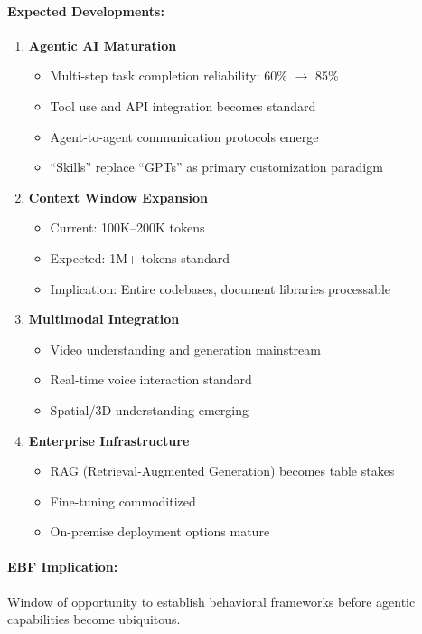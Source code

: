 \paragraph{Expected Developments:}
\begin{enumerate}
    \item \textbf{Agentic AI Maturation}
    \begin{itemize}
        \item Multi-step task completion reliability: 60\% $\rightarrow$ 85\%
        \item Tool use and API integration becomes standard
        \item Agent-to-agent communication protocols emerge
        \item ``Skills'' replace ``GPTs'' as primary customization paradigm
    \end{itemize}

    \item \textbf{Context Window Expansion}
    \begin{itemize}
        \item Current: 100K--200K tokens
        \item Expected: 1M+ tokens standard
        \item Implication: Entire codebases, document libraries processable
    \end{itemize}

    \item \textbf{Multimodal Integration}
    \begin{itemize}
        \item Video understanding and generation mainstream
        \item Real-time voice interaction standard
        \item Spatial/3D understanding emerging
    \end{itemize}

    \item \textbf{Enterprise Infrastructure}
    \begin{itemize}
        \item RAG (Retrieval-Augmented Generation) becomes table stakes
        \item Fine-tuning commoditized
        \item On-premise deployment options mature
    \end{itemize}
\end{enumerate}

\paragraph{EBF Implication:} Window of opportunity to establish behavioral
frameworks before agentic capabilities become ubiquitous.

